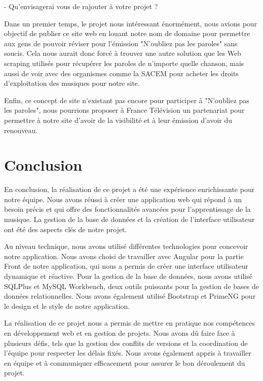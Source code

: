 \documentclass[12pt,french]{article}
\begin{document}
- Qu'envisagerai vous de rajouter à votre projet ?
\newline

Dans un premier temps, le projet nous intéressant énormément, nous avions pour objectif de publier ce site web en louant notre nom de domaine pour permettre aux gens de pouvoir réviser pour l'émission "N'oubliez pas les paroles" sans soucis. Cela nous aurait donc forcé à trouver une autre solution que les \gls{Web scraping} utilisés pour récupérer les paroles de n'importe quelle chanson, mais aussi de voir avec des organismes comme la \gls{SACEM} pour acheter les droits d'exploitation des musiques pour notre site.

Enfin, ce concept de site n'existant pas encore pour participer à "N'oubliez pas les paroles", nous pourrions proposer à France Télévision un partenariat pour permettre à notre site d'avoir de la visibilité et à leur émission d'avoir du renouveau.

\newpage
\vspace*{1cm}

\section*{Conclusion}

En conclusion, la réalisation de ce projet a été une expérience enrichissante pour notre équipe. Nous avons réussi à créer une application web qui répond à un besoin précis et qui offre des fonctionnalités avancées pour l'apprentissage de la musique. La gestion de la base de données et la création de l'interface utilisateur ont été des aspects clés de notre projet.

\medskip

Au niveau technique, nous avons utilisé différentes technologies pour concevoir notre application. Nous avons choisi de travailler avec Angular pour la partie \gls{Front} de notre application, qui nous a permis de créer une interface utilisateur dynamique et réactive. Pour la gestion de la base de données, nous avons utilisé SQLPlus et MySQL Workbench, deux outils puissants pour la gestion de bases de données relationnelles. Nous avons également utilisé Bootstrap et PrimeNG pour le design et le style de notre application.

\medskip

La réalisation de ce projet nous a permis de mettre en pratique nos compétences en développement web et en gestion de projets. Nous avons dû faire face à plusieurs défis, tels que la gestion des conflits de versions et la coordination de l'équipe pour respecter les délais fixés. Nous avons également appris à travailler en équipe et à communiquer efficacement pour assurer le bon déroulement du projet.
\end{document}
